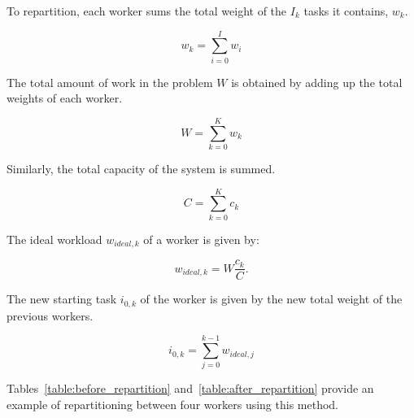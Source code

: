 To repartition, each worker sums the total weight of the $I_k$ tasks it contains, $w_k$.

\begin{equation}
	w_k = \sum_{i = 0}^{I}w_i
\end{equation}

\noindent
The total amount of work in the problem $W$ is obtained by adding up the total weights of each
worker.

\begin{equation}
	W = \sum_{k = 0}^{K}w_k
\end{equation}

\noindent
Similarly, the total capacity of the system is summed.

\begin{equation}
	C = \sum_{k = 0}^{K}c_k
\end{equation}

\noindent
The ideal workload $w_{ideal,k}$ of a worker is given by:

\begin{equation}
	w_{ideal,k} = W \frac{c_k}{C}.
\end{equation}

\noindent
The new starting task $i_{0, k}$ of the worker is given by the new total weight of the previous
workers.

\begin{equation}
	i_{0, k} = \sum_{j = 0}^{k - 1}w_{ideal,j}
\end{equation}

Tables~\ref{table:before_repartition} and~\ref{table:after_repartition} provide an example of
repartitioning between four workers using this method.

